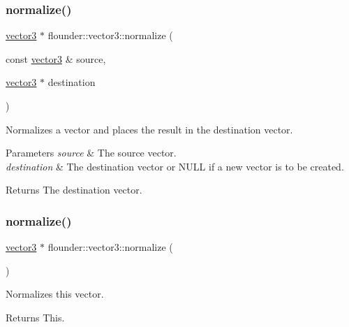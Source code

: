 \subsubsection{\texorpdfstring{normalize()}{normalize()}\hspace{0.1cm}{\footnotesize\ttfamily [1/2]}}
{\footnotesize\ttfamily \hyperlink{classflounder_1_1vector3}{vector3} $\ast$ flounder\+::vector3\+::normalize (\begin{DoxyParamCaption}\item[{const \hyperlink{classflounder_1_1vector3}{vector3} \&}]{source,  }\item[{\hyperlink{classflounder_1_1vector3}{vector3} $\ast$}]{destination }\end{DoxyParamCaption})\hspace{0.3cm}{\ttfamily [static]}}



Normalizes a vector and places the result in the destination vector. 


\begin{DoxyParams}{Parameters}
{\em source} & The source vector. \\
\hline
{\em destination} & The destination vector or N\+U\+LL if a new vector is to be created. \\
\hline
\end{DoxyParams}
\begin{DoxyReturn}{Returns}
The destination vector. 
\end{DoxyReturn}
\mbox{\label{classflounder_1_1vector3_aabd9f495ffdbd3988227ca9b1bf5f794}} 
\subsubsection{\texorpdfstring{normalize()}{normalize()}\hspace{0.1cm}{\footnotesize\ttfamily [2/2]}}
{\footnotesize\ttfamily \hyperlink{classflounder_1_1vector3}{vector3} $\ast$ flounder\+::vector3\+::normalize (\begin{DoxyParamCaption}{ }\end{DoxyParamCaption})}



Normalizes this vector. 

\begin{DoxyReturn}{Returns}
This. 
\end{DoxyReturn}
\mbox{\label{classflounder_1_1vector3_a70876957cd503a2c1d3189906042d1ae}} 

